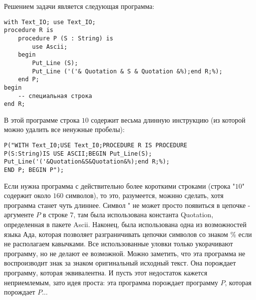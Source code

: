 \documentclass{mai_book}
\begin{document}
Решением задачи является следующая программа:

\begin{lstlisting}[frame=none]
with Text_IO; use Text_IO;
procedure R is
	procedure P (S : String) is
		use Ascii;
	begin
		Put_Line (S);
		Put_Line ('('& Quotation & S & Quotation &%);end R;%);
	end P;
begin
	-- специальная строка
end R;
\end{lstlisting}

В этой программе строка $10$ содержит весьма длинную инструкцию (из которой можно удалить все ненужные пробелы):

\begin{lstlisting}[frame=none]
	P("WITH Text_I0;USE Text_I0;PROCEDURE R IS PROCEDURE
P(S:String)IS USE ASCII;BEGIN Put_Line(S);
Put_Line('('&Quotation&S&Quotation&%);end R;%);
END P; BEGIN P");
\end{lstlisting}

Если нужна программа с действительно более короткими строками
(строка "$10$" содержит около $160$ символов), то это, разумеется, можнно сделать, хотя программа станет чуть длиннее. Символ " не может просто появиться в цепочке - аргументе $P$ в строке $7$, там была использована константа Quotation, определенная в пакете Ascii. Наконец, была использована одна из возможностей языка Ада, которая позволяет разграничивать цепочки символов со знаком \% если не располагаем кавычками. Все использованные уловки только укорачивают программу, но не делают ее возможной. Можно заметить, что эта программа не воспроизводит знак за знаком оригинальный исходный текст. Она порождает программу, которая эквивалентна. И пусть этот недостаток кажется неприемлемым, зато идея проста: эта программа порождает программу $P$, которая порождает $P$...

\newpage
\end{document}
